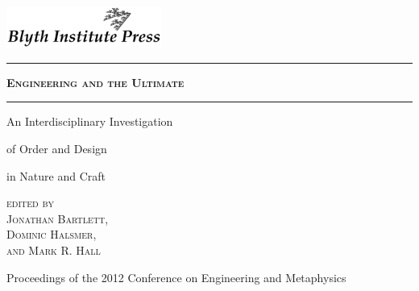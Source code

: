 \begin{titlepage}
\baselineskip

\includegraphics[width=2in]{bipresslogo.png}


\vspace*{\fill}

\clearpage %

\thispagestyle{empty}
\vspace*{\fill}
\begin{center}
\hrule
{\LARGE \textsc{\textbf{Engineering and the Ultimate}}}
\baselineskip
\hrule
{}\baselineskip
\begingroup
\setlength{\parskip}{0cm}
{\LARGE An Interdisciplinary Investigation}

{\LARGE of Order and Design}

{\LARGE in Nature and Craft}
\endgroup

\baselineskip

{\Large 
	{\textsc{ 
		\hfill edited by \hspace*{1in} \\ 
		\hfill Jonathan Bartlett, \hspace*{1in} \\ 
		\hfill Dominic Halsmer, \hspace*{1in} \\
		\hfill and Mark R. Hall \hspace*{1in} \\
	} }
}

\baselineskip


\end{center}
\begin{changemargin}{-1cm}{-1cm}
\begin{center}
{\large
	Proceedings of the 2012 Conference on Engineering and Metaphysics
}
\end{center}
\end{changemargin}

\vspace*{\fill}

\cleardoublepage %

\thispagestyle{empty}
\vspace*{\fill}
\begin{center}
\end{center}
\vspace*{\fill}


\end{titlepage}
